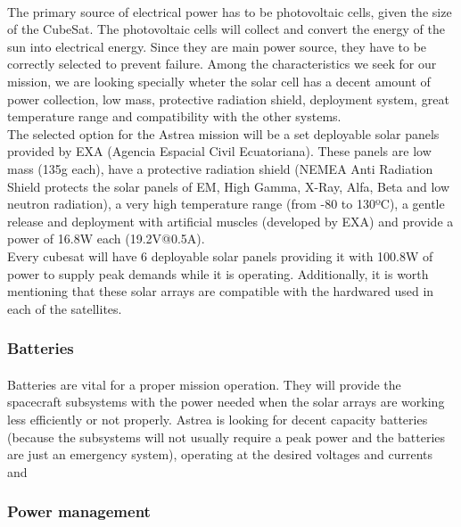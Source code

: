\paragraph{}The primary source of electrical power has to be photovoltaic cells, given the size of the CubeSat. The photovoltaic cells will collect and convert the energy of the sun into electrical energy. Since they are main power source, they have to be correctly selected to prevent failure. Among the characteristics we seek for our mission, we are looking specially wheter the solar cell has a decent amount of power collection, low mass, protective radiation shield, deployment system, great temperature range and compatibility with the other systems.\\
The selected option for the Astrea mission will be a set deployable solar panels provided by EXA (Agencia Espacial Civil Ecuatoriana). These panels are low mass (135g each), have a protective radiation shield (NEMEA Anti Radiation Shield protects the solar panels of EM, High Gamma, X-Ray, Alfa, Beta and low neutron radiation), a very high temperature range (from -80 to 130ºC), a gentle release and deployment with artificial muscles (developed by EXA) and provide a power of 16.8W each (19.2V@0.5A). \\
Every cubesat will have 6 deployable solar panels providing it with 100.8W of power to supply peak demands while it is operating. Additionally, it is worth mentioning that these solar arrays are compatible with the hardwared used in each of the satellites.



\subsubsection{Batteries}

\paragraph{}	Batteries are vital for a proper mission operation. They will provide the spacecraft subsystems with the power needed when the solar arrays are working less efficiently or not properly. Astrea is looking for decent capacity batteries (because the subsystems will not usually require a peak power and the batteries are just an emergency system), operating at the desired voltages and currents and 

\subsubsection{Power management}

